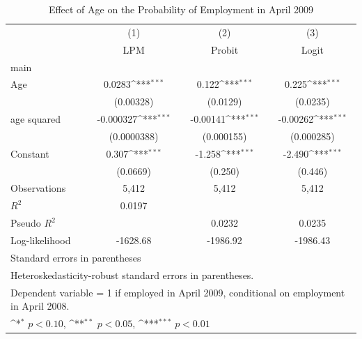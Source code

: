 \begin{table}[H]\centering\small
\def\sym#1{\ifmmode^{#1}\else\(^{#1}\)\fi}
\caption{Effect of Age on the Probability of Employment in April 2009\label{tab:prob1-bcd}}
\begin{tabular}{l*{3}{c}}
\toprule
                    &\multicolumn{1}{c}{(1)}&\multicolumn{1}{c}{(2)}&\multicolumn{1}{c}{(3)}\\
                    &\multicolumn{1}{c}{LPM}&\multicolumn{1}{c}{Probit}&\multicolumn{1}{c}{Logit}\\
\midrule
main                &                     &                     &                     \\
Age                 &      0.0283\sym{***}&       0.122\sym{***}&       0.225\sym{***}\\
                    &   (0.00328)         &    (0.0129)         &    (0.0235)         \\
\addlinespace
age squared         &   -0.000327\sym{***}&    -0.00141\sym{***}&    -0.00262\sym{***}\\
                    & (0.0000388)         &  (0.000155)         &  (0.000285)         \\
\addlinespace
Constant            &       0.307\sym{***}&      -1.258\sym{***}&      -2.490\sym{***}\\
                    &    (0.0669)         &     (0.250)         &     (0.446)         \\
\midrule
Observations        &       5,412         &       5,412         &       5,412         \\
$R^2$               &      0.0197         &                     &                     \\
Pseudo $R^2$        &                     &      0.0232         &      0.0235         \\
Log-likelihood      &    -1628.68         &    -1986.92         &    -1986.43         \\
\bottomrule
\multicolumn{4}{l}{\footnotesize Standard errors in parentheses}\\
\multicolumn{4}{l}{\footnotesize Heteroskedasticity-robust standard errors in parentheses.}\\
\multicolumn{4}{l}{\footnotesize Dependent variable = 1 if employed in April 2009, conditional on employment in April 2008.}\\
\multicolumn{4}{l}{\footnotesize \sym{*} \(p<0.10\), \sym{**} \(p<0.05\), \sym{***} \(p<0.01\)}\\
\end{tabular}
\end{table}
